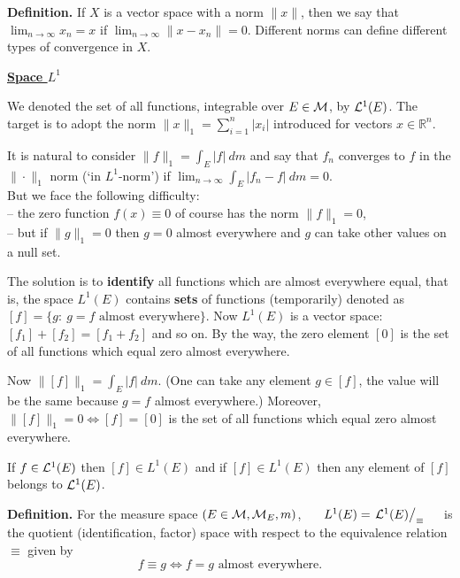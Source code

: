 \documentclass[a4paper,10pt]{article}
\def\RR{\mathbb{R}}
\newcommand{\1}[1]{\mathbf{1}_{\{#1\}}}
\begin{document}
{\bf Definition.} If $X$ is a vector space with a norm $\|x\|$, then we say that $\lim_{n\to\infty} x_n=x$ if $\lim_{n\to\infty} \|x-x_n\|=0$. Different norms can define different types of convergence in $X$.
\vspace{3mm}

\begin{center}\bf\underline{Space $L^1$} \end{center}\vspace{3mm}

We denoted the set of all functions, integrable over $E\in{\cal M}$, by ${\cal L}^1(E)$. The target is to adopt the norm $\|x\|_1=\sum_{i=1}^n |x_i|$ introduced for vectors $x\in\RR^n$.

It is natural to consider $\|f\|_1=\int_E |f| ~dm$ and say that $f_n$ converges to $f$ in the $\|\cdot\|_1$ norm (`in $L^1$-norm') if $\lim_{n\to\infty}\int_E |f_n-f|~dm=0$.\\
But we face the following difficulty:\\
-- the zero function $f(x)\equiv 0$ of course has the norm $\|f\|_1=0$,\\
-- but if $\|g\|_1=0$ then $g=0$ almost everywhere and $g$ can take other values on a null set.

The solution is to {\bf identify} all functions which are almost everywhere equal, that is, the space $L^1(E)$ contains {\bf sets} of functions (temporarily) denoted as $[f]=\{g:~g=f \mbox{ almost everywhere}\}$. Now $L^1(E)$ is a vector space: $[f_1]+[f_2]=[f_1+f_2]$ and so on. By the way, the zero element $[0]$ is the set of all functions which equal zero almost everywhere.

Now $\|[f]\|_1=\int_E |f|~dm$. (One can take any element $g\in[f]$, the value will be the same because $g=f$ almost everywhere.) Moreover, $\|[f]\|_1=0\Longleftrightarrow [f]=[0]$ is the set of all functions which equal zero almost everywhere.

If $f\in{\cal L}^1(E)$ then $[f]\in L^1(E)$ and if $[f]\in L^1(E)$ then any element of $[f]$ belongs to ${\cal L}^1(E)$. \vspace{3mm}

{\bf Definition.} For the measure space $(E\in{\cal M},{\cal M}_E,m)$, \ \ \  $L^1(E)=\left.{\cal L}^1(E)\right/_\equiv$\ \ \  is the quotient (identification, factor) space with respect to the equivalence relation $\equiv$ given by
  $$f\equiv g\Longleftrightarrow f=g \mbox{ almost everywhere.}$$
\vspace{3mm}
\end{document}

